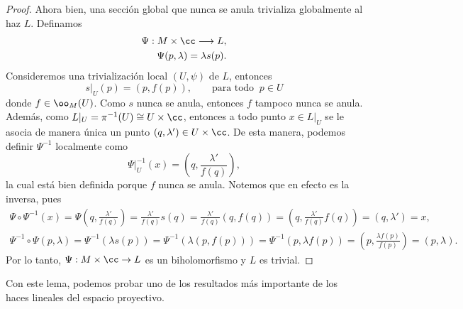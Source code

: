 \begin{proof}
		Ahora bien, una sección global que nunca se anula trivializa globalmente al haz $L$. Definamos
		\begin{align*}
			\Psi:M\times \cc\longrightarrow L,\\
			\Psi(p,\lambda)=\lambda s(p).
		\end{align*}
		Consideremos una trivialización local $(U,\psi)$ de $L$, entonces
		\begin{equation*}
			s|_U(p)=(p,f(p)),\qquad \text{para todo }\ p\in U
		\end{equation*}
		donde $f\in\oo_M(U)$. Como $s$ nunca se anula, entonces $f$ tampoco nunca se anula. Además, como $L|_U=\pi^{-1}(U)\cong U\times \cc$, entonces a todo punto $x\in L|_U$ se le asocia de manera única un punto $(q,\lambda')\in U\times \cc$. De esta manera, podemos definir $\Psi^{-1}$ localmente como
		\begin{equation*}
			\Psi|_U^{-1}(x)=\left(q,\frac{\lambda'}{f(q)}\right),
		\end{equation*}
		la cual está bien definida porque $f$ nunca se anula.
		Notemos que en efecto es la inversa, pues
		\begin{align*}
			\Psi\circ\Psi^{-1}(x)=\Psi\left(q,\frac{\lambda'}{f(q)}\right)=\frac{\lambda'}{f(q)}s(q)=\frac{\lambda'}{f(q)}(q,f(q))=\left(q,\frac{\lambda'}{f(q)}f(q)\right)=(q,\lambda')=x,\\
			\Psi^{-1}\circ\Psi(p,\lambda)=\Psi^{-1}(\lambda s(p))=\Psi^{-1}(\lambda(p,f(p)))=\Psi^{-1}(p,\lambda f(p))=\left(p,\frac{\lambda f(p)}{f(p)}\right)=(p,\lambda).
		\end{align*}
		Por lo tanto, $\Psi:M\times \cc\to L$ es un biholomorfismo y $L$ es trivial.
	\end{proof}
	
	Con este lema, podemos probar uno de los resultados más importante de los haces lineales del espacio proyectivo.
	
